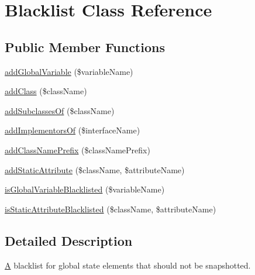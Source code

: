 \hypertarget{class_sebastian_bergmann_1_1_global_state_1_1_blacklist}{}\section{Blacklist Class Reference}
\label{class_sebastian_bergmann_1_1_global_state_1_1_blacklist}
\subsection*{Public Member Functions}
\begin{DoxyCompactItemize}
\item 
\mbox{\hyperlink{class_sebastian_bergmann_1_1_global_state_1_1_blacklist_af8fa57ad01779c5c8f5e385590c29bbf}{add\+Global\+Variable}} (\$variable\+Name)
\item 
\mbox{\hyperlink{class_sebastian_bergmann_1_1_global_state_1_1_blacklist_ac28dce8c796c2f22306ab3886faa4863}{add\+Class}} (\$class\+Name)
\item 
\mbox{\hyperlink{class_sebastian_bergmann_1_1_global_state_1_1_blacklist_a8881b8763acb797e9c032404f8490bde}{add\+Subclasses\+Of}} (\$class\+Name)
\item 
\mbox{\hyperlink{class_sebastian_bergmann_1_1_global_state_1_1_blacklist_aaf65560ec190f818c98cb4d4486c6984}{add\+Implementors\+Of}} (\$interface\+Name)
\item 
\mbox{\hyperlink{class_sebastian_bergmann_1_1_global_state_1_1_blacklist_aaec4c85784bd3ebdb73037dba3bc28c9}{add\+Class\+Name\+Prefix}} (\$class\+Name\+Prefix)
\item 
\mbox{\hyperlink{class_sebastian_bergmann_1_1_global_state_1_1_blacklist_a79b737f55748e7c3f6fd7abb2fbccee5}{add\+Static\+Attribute}} (\$class\+Name, \$attribute\+Name)
\item 
\mbox{\hyperlink{class_sebastian_bergmann_1_1_global_state_1_1_blacklist_ac2089bcc3d25d7cf24703ea926cefdfb}{is\+Global\+Variable\+Blacklisted}} (\$variable\+Name)
\item 
\mbox{\hyperlink{class_sebastian_bergmann_1_1_global_state_1_1_blacklist_af4c6e4aba9ffa521d7e99c240ad125d6}{is\+Static\+Attribute\+Blacklisted}} (\$class\+Name, \$attribute\+Name)
\end{DoxyCompactItemize}


\subsection{Detailed Description}
\mbox{\hyperlink{class_a}{A}} blacklist for global state elements that should not be snapshotted. 


